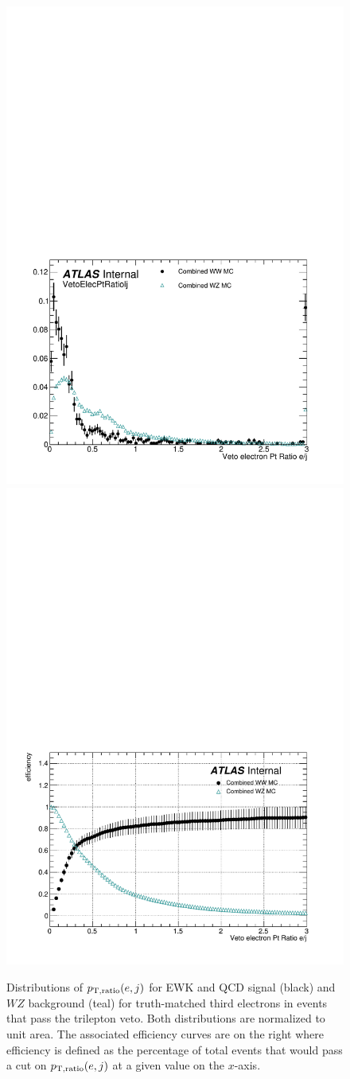\begin{figure}[htbp]
  \centering
  \includegraphics[width=.48\textwidth]{figs/ssww_13tev/custom_or/VetoElecPtRatiolj}
  \includegraphics[width=.48\textwidth]{figs/ssww_13tev/custom_or/ROC_VetoElecPtRatiolj}
  \caption{Distributions of $p_{\textrm{T},\textrm{ratio}}(e,j)$ for EWK and QCD \ssww signal (black) and $WZ$ background (teal) for truth-matched third electrons in events that pass the trilepton veto.  Both distributions are normalized to unit area.  The associated efficiency curves are on the right where efficiency is defined as the percentage of total events that would pass a cut on $p_{\textrm{T},\textrm{ratio}}(e,j)$ at a given value on the $x$-axis.}
  \label{fig:ssww13tev_ptratio_elec}
\end{figure}

